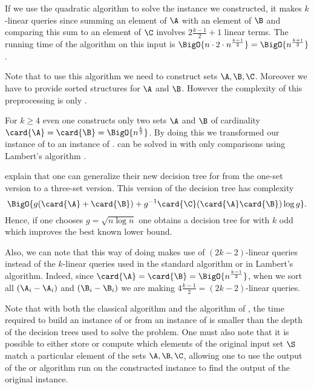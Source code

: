 If we use the quadratic \threeSUM algorithm to solve the instance we
constructed, it makes \(k\)-linear queries since summing an element of
\(\A\) with an element of \(\B\) and comparing this sum to an element of
\(\C\) involves \(2 \frac{k-1}{2} + 1\) linear terms. The running time of
the \threeSUM algorithm on this input is \(\BigO{n \cdot 2 \cdot n^{\frac{k-1}{2}}} =
\BigO{n^{\frac{k+1}{2}}}\).

Note that to use this algorithm we need to construct sets \(\A,\B,\C\).
Moreover we have to provide sorted structures for \(\A\) and \(\B\). However
the complexity of this preprocessing is only .

For \(k \ge 4\) even one constructs only two sets \(\A\) and \(\B\) of
cardinality \(\card{\A} = \card{\B} = \BigO{n^{\frac{k}{2}}}\). By doing this
we transformed our instance of \kLDT to an instance of \twoSUM. \twoSUM can be
solved in  with only 
comparisons using Lambert's algorithm \cite{lambert:1990}.

\citet*{gronlund:2014} explain that one can generalize their new decision tree
for \threeSUM from the one-set version to a three-set version. This version of
the decision tree has complexity
\begin{displaymath}
\BigO{g(\card{\A}+\card{\B}) + g^{-1}\card{\C}(\card{\A}\card{\B})\log g}.
\end{displaymath}
Hence, if one chooses \(g = \sqrt{n \log n}\) one obtains a
 decision tree for \kLDT with $k$ odd
which improves the best known lower bound.

Also, we can note that this way of doing makes use of \((2k-2)\)-linear queries
instead of the \(k\)-linear queries used in the standard \threeSUM
algorithm or in Lambert's algorithm. Indeed, since \(\card{\A} = \card{\B} =
\BigO{n^{\frac{k-1}{2}}}\), when we sort all \((\A_i - \A_i)\) and \((\B_i -
\B_i)\) we are making \(4 \frac{k-1}{2} = (2k-2)\)-linear queries.

Note that with both the classical algorithm and the algorithm of
\citet*{gronlund:2014}, the time required to build an instance of \twoSUM or
\threeSUM from an instance of \kLDT is smaller than the depth of the decision
trees used to solve the problem. One must also note that it is possible to
either store or compute which elements of the original input set \(\S\) match a
particular element of the sets \(\A,\B,\C\), allowing one to use the output of
the \twoSUM or \threeSUM algorithm run on the constructed instance to find the
output of the original \kLDT instance.


